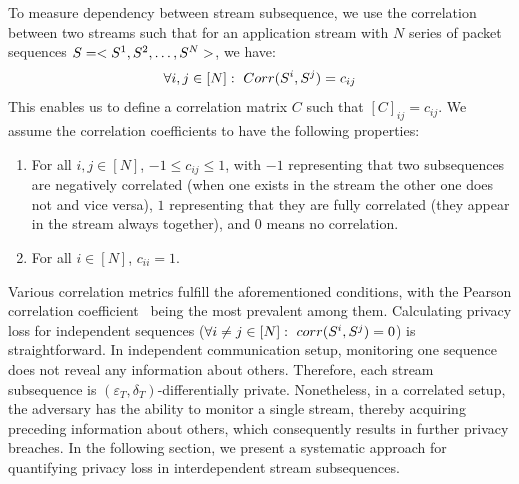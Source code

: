 To measure dependency between stream subsequence, we use the correlation between two streams such that for an application stream with $N$ series of packet sequences $S = <S^1, S^2, \dots, S^N>$, we have:
\begin{equation*}
  \forall i,j \in [N]:~Corr(S^i, S^j) = c_{ij}
\end{equation*}
\noindent
This enables us to define a correlation matrix $C$ such that $[C]_{ij}=c_{ij}$.
We assume the correlation coefficients to have the following properties:
\begin{enumerate}
  \item For all $i,j \in [N]$, $-1 \leq c_{ij} \leq 1$, with $-1$ representing that two subsequences are negatively correlated (\ie when one exists in the stream the other one does not and vice versa), $1$ representing that they are fully correlated (\ie they appear in the stream always together), and $0$ means no correlation.
  \item For all $i \in [N]$, $c_{ii} = 1$.
\end{enumerate}
Various correlation metrics fulfill the aforementioned conditions, with the Pearson correlation coefficient~\cite{cohen2009pearson} being the most prevalent among them. 
\noindent
Calculating privacy loss for independent sequences (\ie $\forall i \neq j \in [N]:~corr(S^i, S^j) = 0$) is straightforward. 
In independent communication setup, monitoring one sequence does not reveal any information about others. 
Therefore, each stream subsequence is $(\varepsilon_T, \delta_T)$-differentially private.
Nonetheless, in a correlated setup, the adversary has the ability to monitor a single stream, thereby acquiring preceding information about others, which consequently results in further privacy breaches. 
In the following section, we present a systematic approach for quantifying privacy loss in interdependent stream subsequences.
















